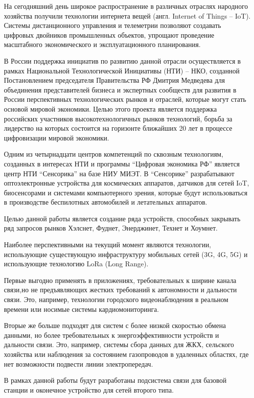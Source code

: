  \label{chap:introduction}
На сегодняшний день широкое распространение в различных отраслях народного хозяйства получили технологии интернета вещей (англ. Internet of Things – IoT). Системы дистанционного управления и телеметрии позволяют создавать цифровых двойников промышленных объектов, упрощают проведение масштабного экономического и эксплуатационного планирования. 

В России поддержка инициатив по развитию данной отрасли осуществляется в рамках Национальной Технологической Инициативы (НТИ) -- НКО, созданной Постановлением председателя Правительства РФ Дмитрия Медведева для объединения представителей бизнеса и экспертных сообществ для развития в России перспективных технологических рынков и отраслей, которые могут стать основой мировой экономики. Целью этого проекта является поддержка российских участников высокотехнологичных рынков технологий, борьба за лидерство на которых состоится на горизонте ближайших 20 лет в процессе цифровизации мировой экономики.\cite{nti2035}

Одним из четырнадцати центров компетенций по сквозным технологиям, созданных в интересах НТИ и программы “Цифровая экономика РФ” является центр НТИ “Сенсорика” на базе НИУ МИЭТ. В “Сенсорике” разрабатывают оптоэлектронные устройства для космических аппаратов, датчиков для сетей IoT, биосенсорами и системами компьютерного зрения, которые будут использоваться в производстве беспилотных автомобилей и летательных аппаратов. 

Целью данной работы является создание ряда устройств, способных закрывать ряд запросов рынков  Хэлснет, Фуднет, Энерджинет, Технет и Хоумнет.

Наиболее перспективными на текущий момент являются технологии, использующие существующую инфраструктуру мобильных сетей (3G, 4G, 5G) и использующие технологию LoRa (Long Range). 

Первые выгодно применять в приложениях, требовательных к ширине канала связи,но не предъявляющих жестких требований к автономности и дальности связи. Это, например, технологии городского видеонаблюдения в реальном времени или носимые системы кардиомониторинга. 

Вторые же больше подходят для систем с более низкой скоростью обмена данными, но более требовательных к энергоэффективности устройств и дальности связи. Это, например, системы сбора данных для ЖКХ, сельского хозяйства или наблюдения за состоянием газопроводов в удаленных областях, где нет возможности подвести линии электропередач. 

В рамках данной работы будут разработаны подсистема связи для базовой станции и оконечное устройство для сетей второго типа.


